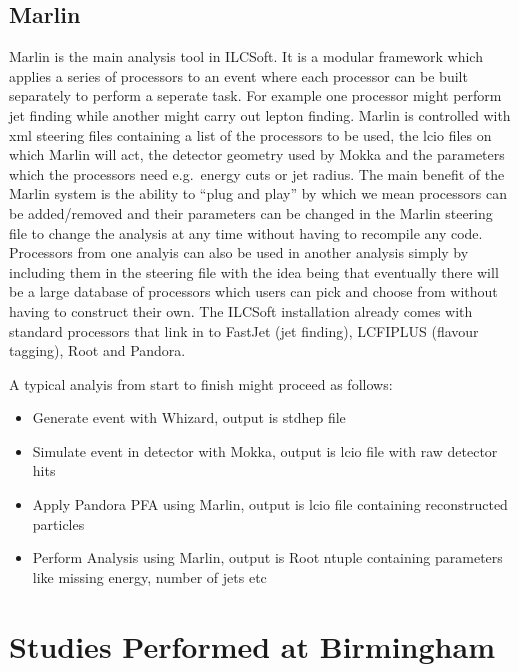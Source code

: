 \section{Marlin}
Marlin is the main analysis tool in ILCSoft. It is a modular framework which applies a series of processors to an event where each processor can be built separately to perform a seperate task. For example one processor might perform jet finding while another might carry out lepton finding. Marlin is controlled with xml steering files containing a list of the processors to be used, the lcio files on which Marlin will act, the detector geometry used by Mokka and the parameters which the processors need e.g.\ energy cuts or jet radius. The main benefit of the Marlin system is the ability to ``plug and play'' by which we mean processors can be added/removed and their parameters can be changed in the Marlin steering file to change the analysis at any time without having to recompile any code. Processors from one analyis can also be used in another analysis simply by including them in the steering file with the idea being that eventually there will be a large database of processors which users can pick and choose from without having to construct their own. The ILCSoft installation already comes with standard processors that link in to FastJet (jet finding), LCFIPLUS (flavour tagging), Root and Pandora.

A typical analyis from start to finish might proceed as follows:
\begin{itemize}
\item Generate event with Whizard, output is stdhep file
\item Simulate event in detector with Mokka, output is lcio file with raw detector hits
\item Apply Pandora PFA using Marlin, output is lcio file containing reconstructed particles
\item Perform Analysis using Marlin, output is Root ntuple containing parameters like missing energy, number of jets etc 
\end{itemize}

\chapter{Studies Performed at Birmingham}

